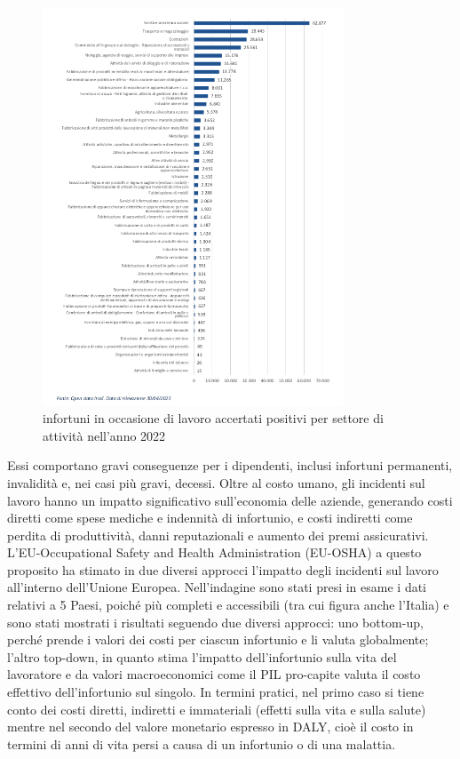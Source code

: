 \begin{figure}[htbp]
    \centering
    \includegraphics[width=0.8\textwidth]{figures/infortuni_industria_e_servizi.png}
    \caption{infortuni in occasione di lavoro accertati positivi per settore di attività nell'anno 2022}
    \label{fig:inforsplit}
\end{figure}

\noindent Essi comportano gravi conseguenze per i dipendenti, inclusi infortuni permanenti, invalidità e, nei casi più gravi, decessi. Oltre al costo umano, gli incidenti sul lavoro hanno un impatto significativo sull'economia delle aziende, generando costi diretti come spese mediche e indennità di infortunio, e costi indiretti come perdita di produttività, danni reputazionali e aumento dei premi assicurativi. L'EU-Occupational Safety and Health Administration (EU-OSHA) a questo proposito ha stimato in due diversi approcci l'impatto degli incidenti sul lavoro all'interno dell'Unione Europea\cite{osha-eu}. Nell'indagine sono stati presi in esame i dati relativi a 5 Paesi, poiché più completi e accessibili (tra cui figura anche l'Italia) e sono stati mostrati i risultati seguendo due diversi approcci: uno bottom-up, perché prende i valori dei costi per ciascun infortunio e li valuta globalmente; l'altro top-down, in quanto stima l'impatto dell'infortunio sulla vita del lavoratore e da valori macroeconomici come il PIL pro-capite valuta il costo effettivo dell'infortunio sul singolo. In termini pratici, nel primo caso si tiene conto dei costi diretti, indiretti e immateriali (effetti sulla vita e sulla salute) mentre nel secondo del valore monetario espresso in DALY, cioè il costo in termini di anni di vita persi a causa di un infortunio o di una malattia.

